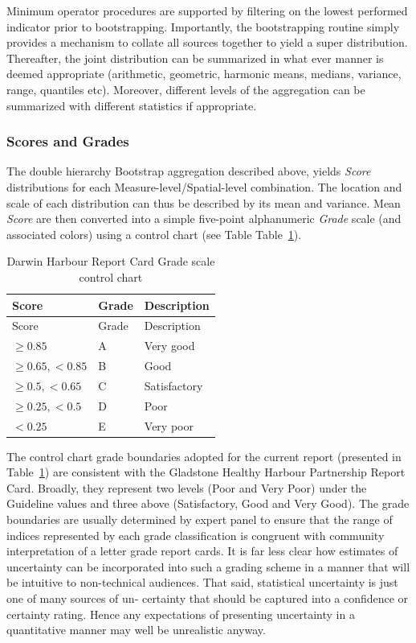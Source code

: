 \documentclass[
  8pt,
  a4paper]{article}
\begin{document}
Minimum operator procedures are supported by filtering on the lowest
performed indicator prior to bootstrapping. Importantly, the
bootstrapping routine simply provides a mechanism to collate all sources
together to yield a super distribution. Thereafter, the joint
distribution can be summarized in what ever manner is deemed appropriate
(arithmetic, geometric, harmonic means, medians, variance, range,
quantiles etc). Moreover, different levels of the aggregation can be
summarized with different statistics if appropriate.

\subsubsection{Scores and Grades}\label{scores-and-grades}

The double hierarchy Bootstrap aggregation described above, yields
\emph{Score} distributions for each Measure-level/Spatial-level
combination. The location and scale of each distribution can thus be
described by its mean and variance. Mean \emph{Score} are then converted
into a simple five-point alphanumeric \emph{Grade} scale (and associated
colors) using a control chart (see Table Table~\ref{tbl-control}).

\begin{longtable}[]{@{}lll@{}}
\caption{Darwin Harbour Report Card Grade scale control
chart}\label{tbl-control}\tabularnewline
\toprule\noalign{}
Score & Grade & Description \\
\midrule\noalign{}
\endfirsthead
\toprule\noalign{}
Score & Grade & Description \\
\midrule\noalign{}
\endhead
\bottomrule\noalign{}
\endlastfoot
\(\ge 0.85\) & A & Very good \\
\(\ge 0.65, <0.85\) & B & Good \\
\(\ge 0.5, <0.65\) & C & Satisfactory \\
\(\ge 0.25, <0.5\) & D & Poor \\
\(<0.25\) & E & Very poor \\
\end{longtable}

The control chart grade boundaries adopted for the current report
(presented in Table~\ref{tbl-control}) are consistent with the Gladstone
Healthy Harbour Partnership Report Card. Broadly, they represent two
levels (Poor and Very Poor) under the Guideline values and three above
(Satisfactory, Good and Very Good). The grade boundaries are usually
determined by expert panel to ensure that the range of indices
represented by each grade classification is congruent with community
interpretation of a letter grade report cards. It is far less clear how
estimates of uncertainty can be incorporated into such a grading scheme
in a manner that will be intuitive to non-technical audiences. That
said, statistical uncertainty is just one of many sources of un-
certainty that should be captured into a confidence or certainty rating.
Hence any expectations of presenting uncertainty in a quantitative
manner may well be unrealistic anyway.
\end{document}
